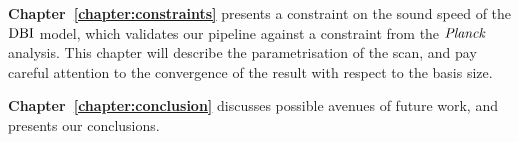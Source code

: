 

\textbf{Chapter~\ref{chapter:constraints}} presents a constraint
on the sound speed of the $\text{DBI}$ model, which validates our pipeline against a constraint
from the $\textit{Planck}$ analysis.
This chapter will describe the parametrisation of the scan,
and pay careful attention to the convergence of the result
with respect to the basis size.


\textbf{Chapter~\ref{chapter:conclusion}} discusses possible avenues of future work,
and presents our conclusions.

